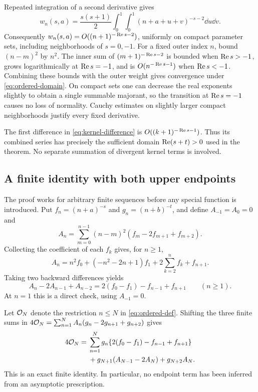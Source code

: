 Repeated integration of a second derivative gives
\begin{equation}\label{eq:second-difference-integral}
 w_n(s,a)=\frac{s(s+1)}2\int_0^1\int_0^1
               (n+a+u+v)^{-s-2}\dd u\dd v.
\end{equation}
Consequently $w_n(s,a)=O((n+1)^{-\operatorname{Re} s-2})$, uniformly on compact
parameter sets, including neighborhoods of $s=0,-1$.
For a fixed outer index $n$, bound $(n-m)^2$ by $n^2$.
The inner sum of $(m+1)^{-\operatorname{Re} s-2}$ is bounded when
$\operatorname{Re} s>-1$, grows logarithmically at $\operatorname{Re} s=-1$, and is
$O(n^{-\operatorname{Re} s-1})$ when $\operatorname{Re} s<-1$. Combining these bounds with
the outer weight gives convergence under \eqref{eq:ordered-domain}.
On compact sets one can decrease the real exponents slightly to
obtain a single summable majorant, so the transition at $\operatorname{Re} s=-1$
causes no loss of normality. Cauchy estimates on slightly larger
compact neighborhoods justify every fixed derivative.

The first difference in \eqref{eq:kernel-difference} is
$O((k+1)^{-\operatorname{Re} s-1})$. Thus its combined series has precisely the
sufficient domain $\operatorname{Re}(s+t)>0$ used in the theorem. No separate
summation of divergent kernel terms is involved.

\subsection{A finite identity with both upper endpoints}

The proof works for arbitrary finite sequences before any special
function is introduced. Put $f_n=(n+a)^{-s}$ and $g_n=(n+b)^{-t}$,
and define $A_{-1}=A_0=0$ and
\begin{equation}\label{eq:A-n}
 A_n=\sum_{m=0}^{n-1}(n-m)^2(f_m-2f_{m+1}+f_{m+2}).
\end{equation}
Collecting the coefficient of each $f_k$ gives, for $n\ge1$,
\begin{equation}\label{eq:A-explicit}
 A_n=n^2f_0+(-n^2-2n+1)f_1
                  +2\sum_{k=2}^{n}f_k+f_{n+1}.
\end{equation}
Taking two backward differences yields
\begin{equation}\label{eq:A-difference}
 A_n-2A_{n-1}+A_{n-2}
          =2(f_0-f_1)-f_{n-1}+f_{n+1}\qquad(n\ge1).
\end{equation}
At $n=1$ this is a direct check, using $A_{-1}=0$.

Let $\mathcal O_N$ denote the restriction $n\le N$ in
\eqref{eq:ordered-def}. Shifting the three finite sums in
$4\mathcal O_N=\sum_{n=1}^N A_n(g_n-2g_{n+1}+g_{n+2})$ gives
\begin{align}\label{eq:finite-ordered}
 4\mathcal O_N={}&\sum_{n=1}^{N}g_n
              \{2(f_0-f_1)-f_{n-1}+f_{n+1}\}\notag\\
 &+g_{N+1}(A_{N-1}-2A_N)+g_{N+2}A_N.
\end{align}
This is an exact finite identity. In particular, no endpoint term
has been inferred from an asymptotic prescription.

